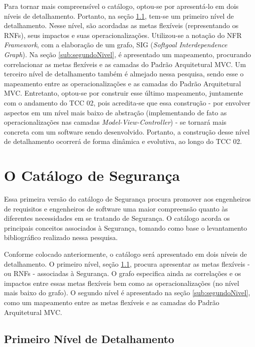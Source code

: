 Para tornar mais compreensível o catálogo, optou-se por apresentá-lo em dois níveis de detalhamento. Portanto, na seção \ref{sub:primeiroNivel}, tem-se um primeiro nível de detalhamento. Nesse nível, são acordadas as metas flexíveis (representando os RNFs), seus impactos e suas operacionalizações. Utilizou-se a notação do NFR \textit{Framework}, com a elaboração de um grafo, SIG (\textit{Softgoal Interdependence Graph}). Na seção \ref{sub:segundoNivel}, é apresentado um mapeamento, procurando correlacionar as metas flexíveis e as camadas do Padrão Arquitetural MVC. Um terceiro nível de detalhamento também é almejado nessa pesquisa, sendo esse o mapeamento entre as operacionalizações e as camadas do Padrão Arquitetural MVC. Entretanto, optou-se por construir esse último mapeamento, juntamente com o andamento do TCC 02, pois acredita-se que essa construção - por envolver aspectos em um nível mais baixo de abstração (implementando de fato as operacionalizações nas camadas \textit{Model-View-Controller}) - se tornará mais concreta com um software sendo desenvolvido. Portanto, a construção desse nível de detalhamento ocorrerá de forma dinâmica e evolutiva, ao longo do TCC 02.

\section{O Catálogo de Segurança}

Essa primeira versão do catálogo de Segurança procura promover aos engenheiros de requisitos e engenheiros de software uma maior compreensão quanto às diferentes necessidades em se tratando de Segurança. O catálogo acorda os principais conceitos associados à Segurança, tomando como base o levantamento bibliográfico realizado nessa pesquisa.

Conforme colocado anteriormente, o catálogo será apresentado em dois níveis de detalhamento. O primeiro nível, seção \ref{sub:primeiroNivel}, procura apresentar as metas flexíveis - ou RNFs - associadas à Segurança. O grafo especifica ainda as correlações e os impactos entre essas metas flexíveis bem como as operacionalizações (no nível mais baixo do grafo). O segundo nível é apresentado na seção \ref{sub:segundoNivel}, como um mapeamento entre as metas flexíveis e as camadas do Padrão Arquitetural MVC.

\subsection{Primeiro Nível de Detalhamento}
\label{sub:primeiroNivel}

